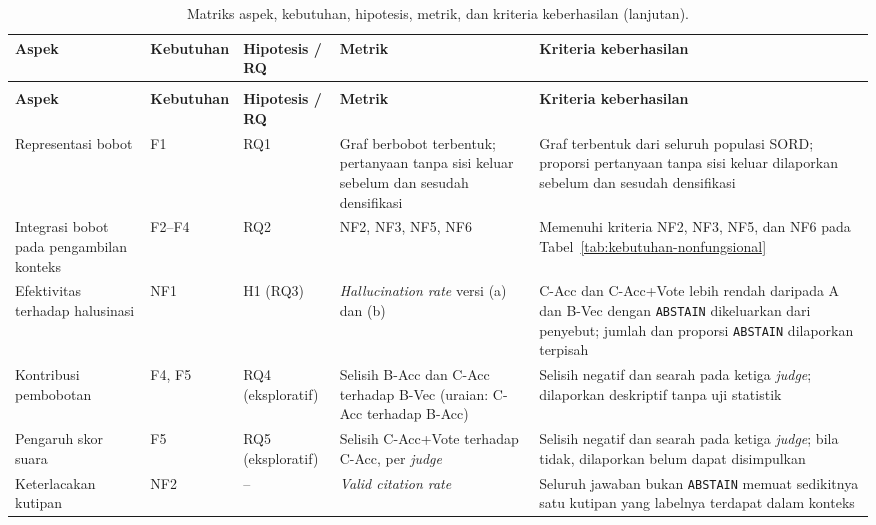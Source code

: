 \begingroup
\footnotesize
\setlength{\tabcolsep}{4pt}
\renewcommand{\arraystretch}{1.2}
\begin{longtable}{|>{\raggedright\arraybackslash}p{}|>{\raggedright\arraybackslash}p{}|>{\raggedright\arraybackslash}p{}|>{\raggedright\arraybackslash}p{}|>{\raggedright\arraybackslash}p{}|}
\caption{Matriks aspek, kebutuhan, hipotesis, metrik, dan kriteria keberhasilan.}
\label{tab:matriks-aspek}\\
\hline
\textbf{Aspek} & \textbf{Kebutuhan} & \textbf{Hipotesis / RQ} & \textbf{Metrik} & \textbf{Kriteria keberhasilan} \\
\hline
\endfirsthead
\caption[]{Matriks aspek, kebutuhan, hipotesis, metrik, dan kriteria keberhasilan (lanjutan).}\\
\hline
\textbf{Aspek} & \textbf{Kebutuhan} & \textbf{Hipotesis / RQ} & \textbf{Metrik} & \textbf{Kriteria keberhasilan} \\
\hline
\endhead
\hline
\endfoot
Representasi bobot & F1 & RQ1 & Graf berbobot terbentuk; pertanyaan tanpa sisi keluar sebelum dan sesudah densifikasi & Graf terbentuk dari seluruh populasi SORD; proporsi pertanyaan tanpa sisi keluar dilaporkan sebelum dan sesudah densifikasi \\
\hline
Integrasi bobot pada pengambilan konteks & F2--F4 & RQ2 & NF2, NF3, NF5, NF6 & Memenuhi kriteria NF2, NF3, NF5, dan NF6 pada Tabel~\ref{tab:kebutuhan-nonfungsional} \\
\hline
Efektivitas terhadap halusinasi & NF1 & H1 (RQ3) & \emph{Hallucination rate} versi (a) dan (b) & C-Acc dan C-Acc+Vote lebih rendah daripada A dan B-Vec dengan \texttt{ABSTAIN} dikeluarkan dari penyebut; jumlah dan proporsi \texttt{ABSTAIN} dilaporkan terpisah \\
\hline
Kontribusi pembobotan & F4, F5 & RQ4 (eksploratif) & Selisih B-Acc dan C-Acc terhadap B-Vec (uraian: C-Acc terhadap B-Acc) & Selisih negatif dan searah pada ketiga \emph{judge}; dilaporkan deskriptif tanpa uji statistik \\
\hline
Pengaruh skor suara & F5 & RQ5 (eksploratif) & Selisih C-Acc+Vote terhadap C-Acc, per \emph{judge} & Selisih negatif dan searah pada ketiga \emph{judge}; bila tidak, dilaporkan belum dapat disimpulkan \\
\hline
Keterlacakan kutipan & NF2 & -- & \emph{Valid citation rate} & Seluruh jawaban bukan \texttt{ABSTAIN} memuat sedikitnya satu kutipan yang labelnya terdapat dalam konteks \\

\end{longtable}
